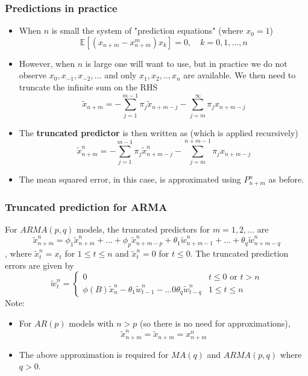 \documentclass[11pt]{article}
\newcommand{\noi}{\noindent}
\begin{document}
\subsubsection{Predictions in practice}
\begin{itemize}
    \item When $n$ is small the system of "prediction equations" (where $x_0 = 1$)
        $$\mathbb{E}[(x_{n+m} - x_{n+m}^m)x_k] = 0, \quad k=0,1,...,n$$
    \item However, when $n$ is large one will want to use, but in practice we do not observe $x_0, x_{-1},x_{-2},...$ and only $x_1,x_2,..,x_n$ are available. We then need to truncate the infinite sum on the RHS
        $$\tilde{x}_{n+m} = -\sum_{j=1}^{m-1}\pi_j\tilde{x}_{n+m-j} - \sum_{j=m}^{\infty}\pi_jx_{n+m-j}$$
    \item The \textbf{truncated predictor} is then written as (which is applied recursively)
        $$\tilde{x}_{n+m}^n = -\sum_{j=1}^{m-1}\pi_j\tilde{x}_{n+m-j}^{n} - \sum_{j=m}^{n+m-1}\pi_jx_{n+m-j}$$
    \item The mean squared error, in this case, is approximated using $P_{n+m}^n$ as before.
\end{itemize}

\subsubsection{Truncated prediction for ARMA}
\noi For $ARMA(p, q)$ models, the truncated predictors for $m=1,2,...$ are
$$\tilde{x}_{n+m}^n = \phi_1\tilde{x}_{n+m}^n + ... + \phi_p\tilde{x}_{n+m-p}^n + \theta_1\tilde{w}_{n+m-1}^{n} + ... + \theta_q \tilde{w}_{n+m-q}^{n}$$,
\noi where $\tilde{x}_t^n = x_t$ for $1 \leq t \leq n$ and $\tilde{x}_t^n = 0$ for $t \leq 0$. The truncated prediction errors are given by
$$\tilde{w}_t^n = \begin{cases}
    0 & t \leq 0 \text{ or } t >n \\
    \phi(B)\tilde{x}_n^n - \theta_1\tilde{w}_{t-1}^n - ... 0 \theta_q\tilde{w}_{t-q}^{n} & 1 \leq t \leq n
\end{cases}$$
\noi Note:
\begin{itemize}
    \item For $AR(p)$ models with $n > p$ (so there is no need for approximations), 
        $$\tilde{x}_{n+m}^n = \tilde{x}_{n+m} = x_{n+m}^n$$
    \item The above approximation is required for $MA(q)$ and $ARMA(p,q)$ where $q>0$.
\end{itemize}
\end{document}

